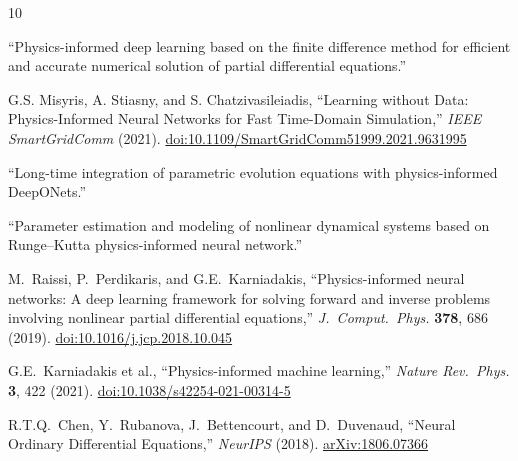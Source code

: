 \documentclass[12pt,a4paper]{article}
\begin{document}
\begin{thebibliography}{10}

``Physics-informed deep learning based on the finite difference method for efficient and accurate numerical solution of partial differential equations.''

G.S. Misyris, A. Stiasny, and S. Chatzivasileiadis,
``Learning without Data: Physics-Informed Neural Networks for Fast Time-Domain Simulation,''
\textit{IEEE SmartGridComm} (2021).
\href{https://doi.org/10.1109/SmartGridComm51999.2021.9631995}{doi:10.1109/SmartGridComm51999.2021.9631995}

``Long-time integration of parametric evolution equations with physics-informed DeepONets.''

``Parameter estimation and modeling of nonlinear dynamical systems based on Runge--Kutta physics-informed neural network.''

M.~Raissi, P.~Perdikaris, and G.E.~Karniadakis,
``Physics-informed neural networks: A deep learning framework for solving forward and inverse problems involving nonlinear partial differential equations,''
\textit{J.~Comput.\ Phys.} \textbf{378}, 686 (2019).
\href{https://doi.org/10.1016/j.jcp.2018.10.045}{doi:10.1016/j.jcp.2018.10.045}

G.E.~Karniadakis et al.,
``Physics-informed machine learning,''
\textit{Nature Rev.\ Phys.} \textbf{3}, 422 (2021).
\href{https://doi.org/10.1038/s42254-021-00314-5}{doi:10.1038/s42254-021-00314-5}

R.T.Q.~Chen, Y.~Rubanova, J.~Bettencourt, and D.~Duvenaud,
``Neural Ordinary Differential Equations,''
\textit{NeurIPS} (2018).
\href{https://arxiv.org/abs/1806.07366}{arXiv:1806.07366}

\end{thebibliography}
\end{document}
